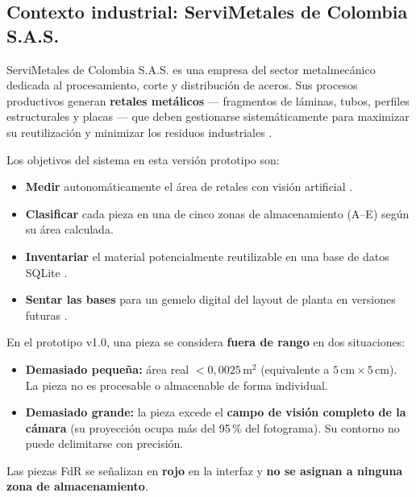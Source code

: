 \documentclass[12pt, a4paper]{article}
\begin{document}
\subsection{Contexto industrial: ServiMetales de Colombia S.A.S.}

ServiMetales de Colombia S.A.S. es una empresa del sector metalmecánico dedicada al
procesamiento, corte y distribución de aceros. Sus procesos productivos generan
\textbf{retales metálicos} --- fragmentos de láminas, tubos, perfiles estructurales y placas
--- que deben gestionarse sistemáticamente para maximizar su reutilización y minimizar
los residuos industriales \cite{malamas2003, chin1982}.

Los objetivos del sistema en esta versión prototipo son:

\begin{itemize}
  \item \textbf{Medir} autonomáticamente el área de retales con visión artificial \cite{gonzalez2018}.
  \item \textbf{Clasificar} cada pieza en una de cinco zonas de almacenamiento (A--E)
        según su área calculada.
  \item \textbf{Inventariar} el material potencialmente reutilizable en una base de datos SQLite \cite{owens2010}.
  \item \textbf{Sentar las bases} para un gemelo digital del layout de planta en versiones futuras \cite{tao2018}.
\end{itemize}

\begin{infobox}[title={Definición operacional: Fuera de Rango (FdR)}]
En el prototipo v1.0, una pieza se considera \textbf{fuera de rango} en dos situaciones:
\begin{itemize}
  \item \textbf{Demasiado peque\~na:} área real $< 0{,}0025\,\text{m}^2$
        (equivalente a $5\,\text{cm} \times 5\,\text{cm}$). La pieza no es
        procesable o almacenable de forma individual.
  \item \textbf{Demasiado grande:} la pieza excede el \textbf{campo de visión
        completo de la cámara} (su proyección ocupa más del 95\,\% del fotograma).
        Su contorno no puede delimitarse con precisión.
\end{itemize}
Las piezas FdR se se\~nalizan en \textcolor{catOut}{\textbf{rojo}} en la interfaz
y \textbf{no se asignan a ninguna zona de almacenamiento}.
\end{infobox}
\end{document}
